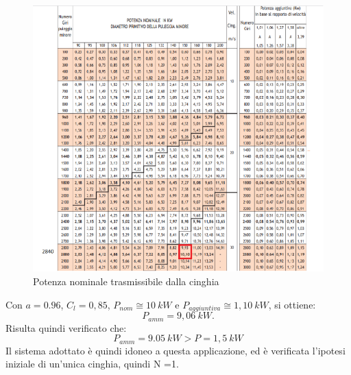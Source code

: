 \begin{figure}[h]
    \centering
    \includegraphics[scale=0.9]{Immagini/PotenzaTrasmissibile.png}
    \caption{Potenza nominale trasmissibile dalla cinghia}
    \label{fig:PotenzaTrasmissibile}
\end{figure}

Con $a=0.96$, $C_l=0,85$, $P_{nom}\cong10\ kW$ e $P_{aggiuntiva}\cong 1,10\ kW$, si ottiene:
\begin{equation}
    P_{amm}=9,06\ kW.
\end{equation}
Risulta quindi verificato che: 
\begin{equation}
    P_{amm}=9.05\ kW>P=1,5\ kW
\end{equation}
Il sistema adottato è quindi idoneo a questa applicazione, ed è verificata l’ipotesi iniziale di un’unica cinghia, quindi N =1. 


